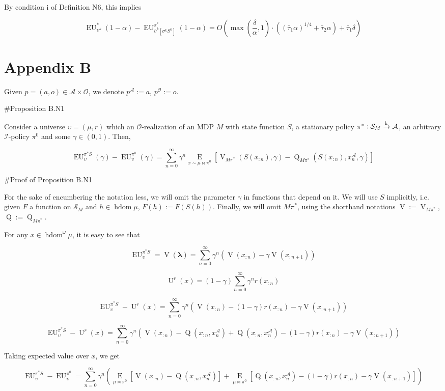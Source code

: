 \documentclass[a4paper]{article}
\newcommand{\AP}[1]{\left(#1\right)}
\newcommand{\AB}[1]{\left[#1\right]}
\newcommand{\Ea}[2]{\underset{#1}{\operatorname{E}}\AB{#2}}
\newcommand{\Estr}{\boldsymbol{\lambda}}
\newcommand{\M}{\xrightarrow{\textnormal{k}}}
\newcommand{\Ob}{\mathcal{O}}
\newcommand{\A}{\mathcal{A}}
\newcommand{\St}{\mathcal{S}}
\newcommand{\In}{\mathcal{I}}
\DeclareMathOperator{\HD}{hdom}
\newcommand{\Ut}{\operatorname{U}}
\newcommand{\V}{\operatorname{V}}
\newcommand{\Q}{\operatorname{Q}}
\newcommand{\EU}{\operatorname{EU}}
\begin{document}
By condition i of Definition N6, this implies

$$\EU_{\upsilon^k}^{*}(1-\alpha)-\EU_{\bar{\upsilon}^k\AB{\sigma^k S^{k}}}^{\pi^*}(1-\alpha) = O\AP{\max\AP{\frac{\delta}{\alpha},1}\cdot\AP{(\bar{\tau}_1 \alpha)^{1/4} + \bar{\tau}_2 \alpha}+\bar{\tau}_1\delta}$$

\section{Appendix B}

Given $p=(a,o)\in\A\times\Ob$, we denote $p^\A:=a$, $p^\Ob:=o$.

\#Proposition B.N1

Consider a universe $\upsilon=(\mu,r)$ which an $\Ob$-realization of an MDP $M$ with state function $S$, a stationary policy $\pi^*: \St_M \M \A$, an arbitrary $\In$-policy $\pi^0$ and some $\gamma \in (0,1)$. Then,

$$\EU_{\upsilon}^{\pi^* S}(\gamma) - \EU_{\upsilon}^{\pi^0}(\gamma)=\sum_{n=0}^\infty {\gamma^n \Ea{x\sim\mu\bowtie\pi^0}{\V_{M\pi^*}\AP{S\AP{x_{:n}},\gamma}-\Q_{M\pi^*}\AP{S\AP{x_{:n}},x_n^\A,\gamma}}}$$

\#Proof of Proposition B.N1

For the sake of encumbering the notation less, we will omit the parameter $\gamma$ in functions that depend on it. We will use $S$ implicitly, i.e. given $F$ a function on $\St_M$ and $h \in \HD{\mu}$, $F(h):=F\AP{S(h)}$. Finally, we will omit $M\pi^*$, using the shorthand notations $\V:=\V_{M\pi^*}$, $\Q:=\Q_{M\pi^*}$.

For any $x \in \HD^\omega \mu$, it is easy to see that

$$\EU_{\upsilon}^{\pi^* S}=\V\AP{\Estr}=\sum_{n=0}^\infty \gamma^n \AP{\V\AP{x_{:n}}-\gamma\V\AP{x_{:n+1}}}$$

$$\Ut^{r}(x)=(1-\gamma)\sum_{n=0}^\infty \gamma^n r\AP{x_{:n}}$$

$$\EU_{\upsilon}^{\pi^* S} - \Ut^{r}(x)=\sum_{n=0}^\infty \gamma^n \AP{\V\AP{x_{:n}}-(1-\gamma)r\AP{x_{:n}}-\gamma\V\AP{x_{:n+1}}}$$

$$\EU_{\upsilon}^{\pi^* S} - \Ut^{r}(x)=\sum_{n=0}^\infty \gamma^n \AP{\V\AP{x_{:n}}-\Q\AP{x_{:n},x_n^\A}+\Q\AP{x_{:n},x_n^\A}-(1-\gamma)r\AP{x_{:n}}-\gamma\V\AP{x_{:n+1}}}$$

Taking expected value over $x$, we get

$$\EU_{\upsilon}^{\pi^* S} - \EU_{\upsilon}^{\pi^0}=\sum_{n=0}^\infty \gamma^n \AP{\Ea{\mu\bowtie\pi^0}{\V\AP{x_{:n}}-\Q\AP{x_{:n},x_n^\A}}+\Ea{\mu\bowtie\pi^0}{\Q\AP{x_{:n},x_n^\A}-(1-\gamma)r\AP{x_{:n}}-\gamma\V\AP{x_{:n+1}}}}$$
\end{document}
